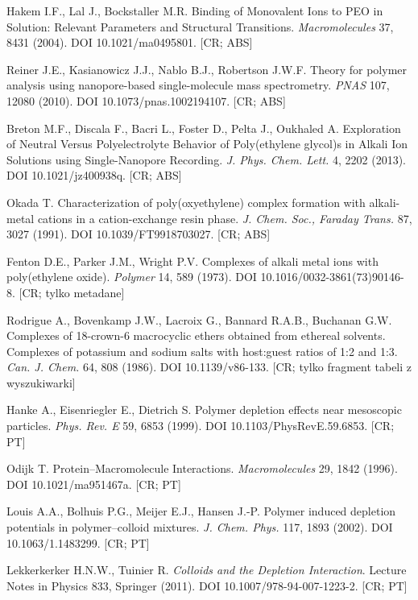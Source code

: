 \documentclass[10pt,a4paper]{article}
\begin{document}
\begin{enumerate}[label={[\arabic*]},ref={\arabic*},leftmargin=*,itemsep=0pt]
\item\label{b:hakem} Hakem I.F., Lal J., Bockstaller M.R. Binding of Monovalent Ions to PEO in Solution: Relevant Parameters and Structural Transitions. \emph{Macromolecules} 37, 8431 (2004). DOI 10.1021/ma0495801. [CR; ABS]
\item\label{b:reiner} Reiner J.E., Kasianowicz J.J., Nablo B.J., Robertson J.W.F. Theory for polymer analysis using nanopore-based single-molecule mass spectrometry. \emph{PNAS} 107, 12080 (2010). DOI 10.1073/pnas.1002194107. [CR; ABS]
\item\label{b:breton} Breton M.F., Discala F., Bacri L., Foster D., Pelta J., Oukhaled A. Exploration of Neutral Versus Polyelectrolyte Behavior of Poly(ethylene glycol)s in Alkali Ion Solutions using Single-Nanopore Recording. \emph{J. Phys. Chem. Lett.} 4, 2202 (2013). DOI 10.1021/jz400938q. [CR; ABS]
\item\label{b:okada91} Okada T. Characterization of poly(oxyethylene) complex formation with alkali-metal cations in a cation-exchange resin phase. \emph{J. Chem. Soc., Faraday Trans.} 87, 3027 (1991). DOI 10.1039/FT9918703027. [CR; ABS]
\item\label{b:fenton} Fenton D.E., Parker J.M., Wright P.V. Complexes of alkali metal ions with poly(ethylene oxide). \emph{Polymer} 14, 589 (1973). DOI 10.1016/0032-3861(73)90146-8. [CR; tylko metadane]
\item\label{b:canj86} Rodrigue A., Bovenkamp J.W., Lacroix G., Bannard R.A.B., Buchanan G.W. Complexes of 18-crown-6 macrocyclic ethers obtained from ethereal solvents. Complexes of potassium and sodium salts with host:guest ratios of 1:2 and 1:3. \emph{Can. J. Chem.} 64, 808 (1986). DOI 10.1139/v86-133. [CR; tylko fragment tabeli z wyszukiwarki]
\item\label{b:hanke} Hanke A., Eisenriegler E., Dietrich S. Polymer depletion effects near mesoscopic particles. \emph{Phys. Rev. E} 59, 6853 (1999). DOI 10.1103/PhysRevE.59.6853. [CR; PT]
\item\label{b:odijk96} Odijk T. Protein--Macromolecule Interactions. \emph{Macromolecules} 29, 1842 (1996). DOI 10.1021/ma951467a. [CR; PT]
\item\label{b:louis} Louis A.A., Bolhuis P.G., Meijer E.J., Hansen J.-P. Polymer induced depletion potentials in polymer--colloid mixtures. \emph{J. Chem. Phys.} 117, 1893 (2002). DOI 10.1063/1.1483299. [CR; PT]
\item\label{b:lt} Lekkerkerker H.N.W., Tuinier R. \emph{Colloids and the Depletion Interaction}. Lecture Notes in Physics 833, Springer (2011). DOI 10.1007/978-94-007-1223-2. [CR; PT]

\end{enumerate}
\end{document}
